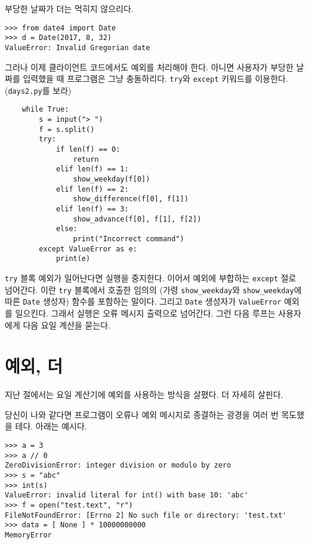 \documentclass[a4paper]{oblivoir}
\begin{document}
부당한 날짜가 더는 먹히지 않으리다.

\begin{lstlisting}
>>> from date4 import Date
>>> d = Date(2017, 8, 32)
ValueError: Invalid Gregorian date
\end{lstlisting}

그러나 이제 클라이언트 코드에서도 예외를 처리해야 한다. 아니면 사용자가 부당한 날짜를 입력했을 때 프로그램은 그냥 충돌하리다. \texttt{try}와 \texttt{except} 키워드를 이용한다. (\texttt{days2.py}를 보라)

\begin{verbatim}
    while True:
        s = input("> ")
        f = s.split()
        try:
            if len(f) == 0:
                return
            elif len(f) == 1:
                show_weekday(f[0])
            elif len(f) == 2:
                show_difference(f[0], f[1])
            elif len(f) == 3:
                show_advance(f[0], f[1], f[2])
            else:
                print("Incorrect command")
        except ValueError as e:
            print(e)
\end{verbatim}

\texttt{try} 블록  예외가 일어난다면 실행을 중지한다. 이어서 예외에 부합하는 \texttt{except} 절로 넘어간다. 이란 \texttt{try} 블록에서 호출한 임의의 (가령 \texttt{show\_weekday}와 \texttt{show\_weekday}에 따른 \texttt{Date} 생성자) 함수를 포함하는 말이다. 그리고 \texttt{Date} 생성자가 \texttt{ValueError} 예외를 일으킨다. 그래서 실행은 오류 메시지 출력으로 넘어간다. 그런 다음 루프는 사용자에게 다음 요일 계산을 묻는다.

\section*{예외, 더}

지난 절에서는 요일 계산기에 예외를 사용하는 방식을 살폈다. 더 자세히 살핀다.

당신이 나와 같다면 프로그램이 오류나 예외 메시지로 종결하는 광경을 여러 번 목도했을 테다. 아래는  예시다.

\begin{lstlisting}
>>> a = 3
>>> a // 0
ZeroDivisionError: integer division or modulo by zero
>>> s = "abc"
>>> int(s)
ValueError: invalid literal for int() with base 10: 'abc'
>>> f = open("test.text", "r")
FileNotFoundError: [Errno 2] No such file or directory: 'test.txt'
>>> data = [ None ] * 10000000000
MemoryError
\end{lstlisting}
\end{document}
